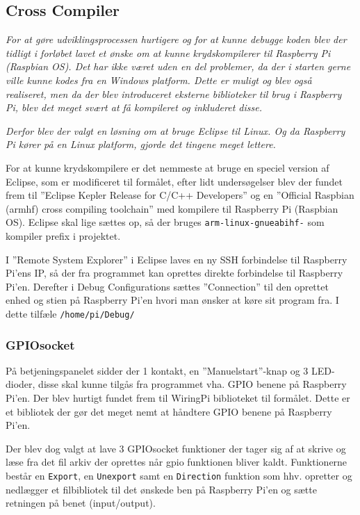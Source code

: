 \subsection*{Cross Compiler}

\textit{For at gøre udviklingsprocessen hurtigere og for at kunne debugge koden blev der tidligt i forløbet lavet et ønske om at kunne krydskompilerer til Raspberry Pi (Raspbian OS). Det har ikke været uden en del problemer, da der i starten gerne ville kunne kodes fra en Windows platform. Dette er muligt og blev også realiseret, men da der blev introduceret eksterne biblioteker til brug i Raspberry Pi, blev det meget svært at få kompileret og inkluderet disse.}

\textit{Derfor blev der valgt en løsning om at bruge Eclipse til Linux. Og da Raspberry Pi kører på en Linux platform, gjorde det tingene meget lettere.}

For at kunne krydskompilere er det nemmeste at bruge en speciel version af Eclipse, som er modificeret til formålet, efter lidt undersøgelser blev der fundet frem til ''Eclipse Kepler Release for C/C++ Developers'' \citep{website:eclipsekepler} og en ''Official Raspbian (armhf) cross compiling toolchain'' \citep{website:rpitoolchain} med kompilere til Raspberry Pi (Raspbian OS). Eclipse skal lige sættes op, så der bruges \verb+arm-linux-gnueabihf-+ som kompiler prefix i projektet.

I ''Remote System Explorer'' i Eclipse laves en ny SSH forbindelse til Raspberry Pi'ens IP, så der fra programmet kan oprettes direkte forbindelse til Raspberry Pi'en. Derefter i Debug Configurations sættes ''Connection'' til den oprettet enhed og stien på Raspberry Pi'en hvori man ønsker at køre sit program fra. I dette tilfæle \verb+/home/pi/Debug/+

\subsubsection*{GPIOsocket}

På betjeningspanelet sidder der 1 kontakt, en ''Manuelstart''-knap og 3 LED-dioder, disse skal kunne tilgås fra programmet vha. GPIO benene på Raspberry Pi'en. Der blev hurtigt fundet frem til WiringPi biblioteket \citep{website:wiringpi} til formålet. Dette er et bibliotek der gør det meget nemt at håndtere GPIO benene på Raspberry Pi'en.

Der blev dog valgt at lave 3 GPIOsocket funktioner der tager sig af at skrive og læse fra det fil arkiv der oprettes når gpio funktionen bliver kaldt. Funktionerne består en \verb+Export+, en \verb+Unexport+ samt en \verb+Direction+ funktion som hhv. opretter og nedlægger et filbibliotek til det ønskede ben på Raspberry Pi'en og sætte retningen på benet (input/output).

